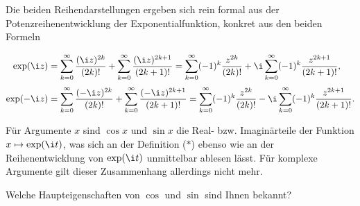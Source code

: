 \begin{antwort}
  Die beiden Reihendarstellungen ergeben sich rein formal aus der 
  Potenzreihenentwicklung der Exponentialfunktion, konkret aus den 
  beiden Formeln

  \begin{align}
    \exp(\i z) &= 
    \sum_{k=0}^\infty \frac{(\i z)^{2k}}{(2k)!} + 
    \sum_{k=0}^\infty \frac{(\i z)^{2k+1}}{(2k+1)!} 
    = \sum_{k=0}^\infty (-1)^k \frac{z^{2k}}{(2k)!} + 
    \i \sum_{k=0}^\infty (-1)^k \frac{z^{2k+1}}{(2k+1)!}, \notag \\[1mm]
    \exp(-\i z) &= 
    \sum_{k=0}^\infty \frac{(-\i z)^{2k}}{(2k)!} + 
    \sum_{k=0}^\infty \frac{(-\i z)^{2k+1}}{(2k+1)!} 
    = 
    \sum_{k=0}^\infty (-1)^k \frac{z^{2k}}{(2k)!} - 
    \i \sum_{k=0}^\infty (-1)^k \frac{z^{2k+1}}{(2k+1)!}. \notag  
  \end{align}

  \medskip\noindent
  Für  Argumente $x$ sind $\cos x$ und $\sin x$ die 
  Real- bzw. Imaginärteile der Funktion $x\mapsto \exp(\i t)$, 
  was sich an der Definition ($\ast$) ebenso wie an der Reihenentwicklung 
  von $\exp(\i t)$ unmittelbar ablesen lässt. Für komplexe Argumente 
  gilt dieser Zusammenhang allerdings nicht mehr. \AntEnd
\end{antwort}

\begin{frage}\label{05_trei}
  Welche Haupteigenschaften von $\cos$ und $\sin$ sind Ihnen bekannt?
\end{frage}

